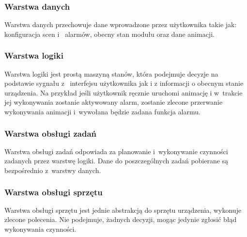 \documentclass[12pt, eng, twoside, openany, final]{mgr}
\begin{document}
                \subsubsection{Warstwa danych}
                Warstwa danych przechowuje dane wprowadzone przez użytkownika takie jak: konfiguracja scen i~ alarmów, obecny stan modułu oraz dane animacji.  
                
                \subsubsection{Warstwa logiki}
                Warstwa logiki jest prostą maszyną stanów, która podejmuje decyzje na podstawie sygnału z~ interfejsu użytkownika jak i z informacji o obecnym stanie urządzenia. Na przykład jeśli użytkownik ręcznie uruchomi animację i w~trakcie jej wykonywania zostanie aktywowany alarm, zostanie zlecone przerwanie wykonywania animacji i~wywołana będzie zadana funkcja alarmu.
                
                \subsubsection{Warstwa obsługi zadań}
                Warstwa obsługi zadań odpowiada za planowanie i~wykonywanie czynności zadanych przez warstwę logiki. Dane do poszczególnych zadań pobierane są bezpośrednio z~warstwy danych.
                
                \subsubsection{Warstwa obsługi sprzętu}
                Warstwa obsługi sprzętu jest jednie abstrakcją do sprzętu urządzenia, wykonuje zlecone polecenia. Nie podejmuje, żadnych decyzji, mogąc jedynie zgłosić błąd wykonywania czynności.
                
                    \newpage
\end{document}
